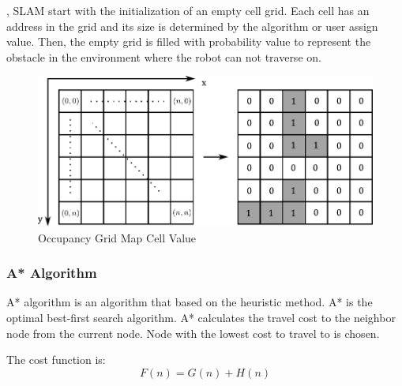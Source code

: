 \break
\hspace{1.27cm}
\textbf{\figureautorefname{ \ref{fig:Occupancy Grid Map Cell Value}}}, SLAM start with the initialization of an empty cell grid. Each cell has an address in the grid and its size is determined by the algorithm or user assign value. Then, the empty grid is filled with probability value to represent the obstacle in the environment where the robot can not traverse on.\par
\begin{figure}[ht]
	\centering
	\includegraphics[scale=1]{images/imagess/6pp-ocm-cell-value.pdf}
	\caption{Occupancy Grid Map Cell Value}
	\label{fig:Occupancy Grid Map Cell Value}
\end{figure}










\subsubsection{A* Algorithm}
\hspace{1.27cm}
A* algorithm is an algorithm that based on the heuristic method. A* is the optimal best-first search algorithm. A* calculates the travel cost to the neighbor node from the current node. Node with the lowest cost to travel to is chosen.\par
The cost function is:
\begin{equation}
F(n)=G(n)+H(n)
\end{equation}

